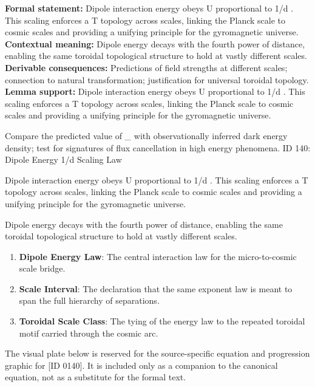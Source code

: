 \begingroup\footnotesize\setlength{\emergencystretch}{3em}\sloppy
\textbf{Formal statement:} Dipole interaction energy obeys U proportional to 1/d . This scaling enforces a T  topology across scales, linking the Planck scale to cosmic scales and providing a unifying principle for the gyromagnetic universe.
\textbf{Contextual meaning:} Dipole energy decays with the fourth power of distance, enabling the same toroidal topological structure to hold at vastly different scales.
\textbf{Derivable consequences:} Predictions of field strengths at different scales; connection to natural transformation; justification for universal toroidal topology.
\textbf{Lemma support:} Dipole interaction energy obeys U proportional to 1/d . This scaling enforces a T  topology across scales, linking the Planck scale to cosmic scales and providing a unifying principle for the gyromagnetic universe.\par
\endgroup

Compare the predicted value of  \_  with observationally inferred dark energy density; test for signatures of flux cancellation in high energy phenomena. ID 140: Dipole Energy 1/d  Scaling Law

Dipole interaction energy obeys U proportional to 1/d . This scaling enforces a T  topology across scales, linking the Planck scale to cosmic scales and providing a unifying principle for the gyromagnetic universe.

Dipole energy decays with the fourth power of distance, enabling the same toroidal topological structure to hold at vastly different scales.
\endgroup

\begin{enumerate}[leftmargin=1.6em,itemsep=6pt,topsep=4pt]
\item \textbf{Dipole Energy Law}: The central interaction law for the micro-to-cosmic scale bridge.
\item \textbf{Scale Interval}: The declaration that the same exponent law is meant to span the full hierarchy of separations.
\item \textbf{Toroidal Scale Class}: The tying of the energy law to the repeated toroidal motif carried through the cosmic arc.
\end{enumerate}

\begingroup\footnotesize\sloppy
The visual plate below is reserved for the source-specific equation and progression graphic for [ID 0140]. It is included only as a companion to the canonical equation, not as a substitute for the formal text.
\par\endgroup
\ifTZPDarkEdition
{}
\fi

